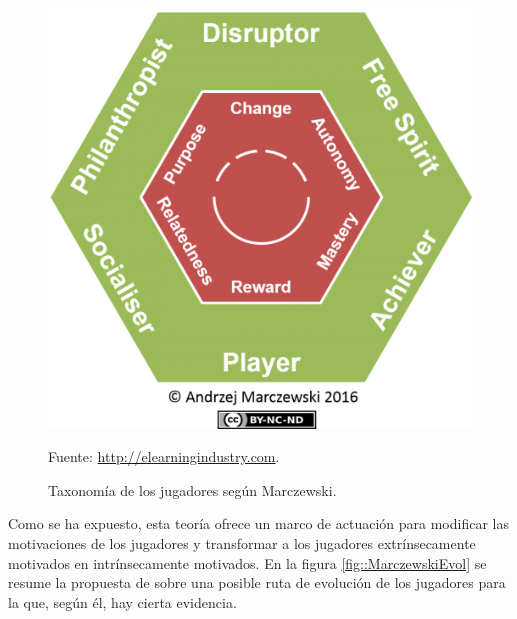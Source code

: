 \begin{figure}[hbtp]
\begin{center}
\caption{Taxonomía de los jugadores según Marczewski.}
\label{fig::Marczewski}
\includegraphics[scale=0.65]{img/Marczewski.jpg}

\vspace{-0.25cm}
\small{Fuente: \url{http://elearningindustry.com}.}
\end{center}
\end{figure}
\FloatBarrier

Como se ha expuesto, esta teoría ofrece un marco de actuación para modificar las motivaciones de los jugadores y transformar a los jugadores extrínsecamente motivados en intrínsecamente motivados.
%
En la figura \ref{fig::MarczewskiEvol} se resume la propuesta de  \cite{marczewski} sobre una posible ruta de evolución de los jugadores para la que, según él, hay cierta evidencia.

